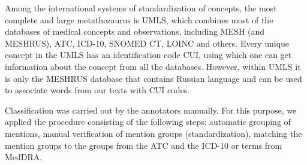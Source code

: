 \documentclass[a4paper,fleqn,longmktitle]{cas-dc}
\begin{document}
Among the international systems of standardization of concepts, the most complete and large metathezaurus is UMLS, which combines most of the databases of medical concepts and observations, including MESH (and MESHRUS), ATC, ICD-10, SNOMED CT, LOINC and others. Every unique concept in the UMLS has an identification code CUI, using which one can get information about the concept from all the databases. However, within UMLS it is only the MESHRUS database that contains Russian language and can be used to associate words from our texts with CUI codes. 


Classification was carried out by the annotators manually. For this purpose, we applied the procedure consisting of the following steps:
automatic grouping of mentions, manual verification of mention groups (standardization), matching the mention groups to the groups from the ATC and the ICD-10 or terms from MedDRA.
\end{document}

